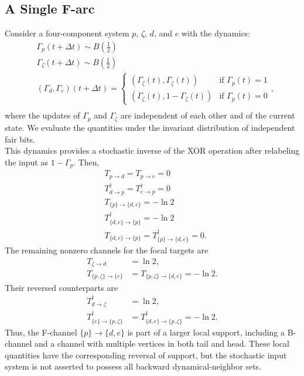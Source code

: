 \documentclass{comnet}%
\begin{document}
\subsection{\label{app:Identification_Examples_F} A Single F-arc}
Consider a four-component system $p$, $\zeta$, $d$, and $e$ with the dynamics:
\begin{equation}\begin{aligned}
		&\Gamma_{p}(t + \Delta t) \sim B(\frac{1}{2})\\
		&\Gamma_{\zeta}(t + \Delta t) \sim B(\frac{1}{2})\\
		&(\Gamma_{d}, \Gamma_{e})(t + \Delta t) = 
		\begin{cases}
			(\Gamma_{\zeta}(t), \Gamma_{\zeta}(t)) & \text{if } \Gamma_{p}(t)=1\\
			(\Gamma_{\zeta}(t), 1-\Gamma_{\zeta}(t)) & \text{if } \Gamma_{p}(t)=0
		\end{cases},\\
		\label{eq:Stochastic_inverse}\end{aligned}\end{equation}
where the updates of $\Gamma_p$ and $\Gamma_\zeta$ are independent of each other and of the current state. We evaluate the quantities under the invariant distribution of independent fair bits.\\
This dynamics provides a stochastic inverse of the XOR operation after relabeling the input as $1-\Gamma_p$. Then,
\begin{equation}\begin{aligned}
		&T_{p \to d} = T_{p \to e} = 0\\
		&T^{\dagger}_{d \to p} = T^{\dagger}_{e \to p} = 0\\
		&T_{\{p\} \to \{d,e\}} = - \ln 2\\
		&T^{\dagger}_{\{d,e\} \to \{p\}} = - \ln 2\\
		&T_{\{d,e\} \to \{p\}} = T^{\dagger}_{\{p\} \to \{d,e\}} = 0.
\end{aligned}\end{equation}
The remaining nonzero channels for the focal targets are
\begin{equation}\begin{aligned}
 T_{\zeta\to d}&=\ln 2,\\
 T_{\{p,\zeta\}\to\{e\}}&=T_{\{p,\zeta\}\to\{d,e\}}=-\ln 2.
\end{aligned}\end{equation}
Their reversed counterparts are
\begin{equation}\begin{aligned}
 T^{\dagger}_{d\to\zeta}&=\ln 2,\\
 T^{\dagger}_{\{e\}\to\{p,\zeta\}}&=T^{\dagger}_{\{d,e\}\to\{p,\zeta\}}=-\ln 2.
\end{aligned}\end{equation}
Thus, the F-channel $\{p\}\to\{d,e\}$ is part of a larger local support, including a B-channel and a channel with multiple vertices in both tail and head. These local quantities have the corresponding reversal of support, but the stochastic input system is not asserted to possess all backward dynamical-neighbor sets.



\end{document}
